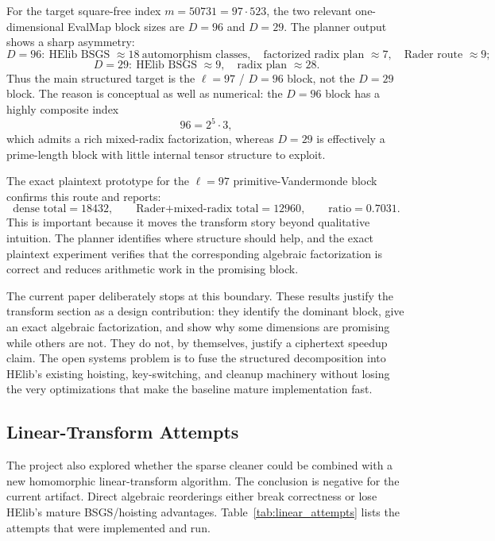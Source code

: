 \documentclass[a4paper,runningheads]{llncs}
\newcommand{\HElib}{\textsf{HElib}}
\begin{document}
For the target square-free index $m=50731=97\cdot523$, the two relevant
one-dimensional EvalMap block sizes are $D=96$ and $D=29$. The planner output
shows a sharp asymmetry:
\[
D=96:\ \text{HElib BSGS }\approx18\ \text{automorphism classes},\quad
\text{factorized radix plan }\approx7,\quad
\text{Rader route }\approx9;
\]
\[
D=29:\ \text{HElib BSGS }\approx9,\quad \text{radix plan }\approx28.
\]
Thus the main structured target is the $\ell=97$ / $D=96$ block, not the
$D=29$ block. The reason is conceptual as well as numerical: the $D=96$ block
has a highly composite index
\[
  96 = 2^5\cdot 3,
\]
which admits a rich mixed-radix factorization, whereas $D=29$ is effectively a
prime-length block with little internal tensor structure to exploit.

The exact plaintext prototype for the $\ell=97$ primitive-Vandermonde block
confirms this route and reports:
\[
  \text{dense total}=18432,
  \qquad
  \text{Rader+mixed-radix total}=12960,
  \qquad
  \text{ratio}=0.7031.
\]
This is important because it moves the transform story beyond qualitative
intuition. The planner identifies where structure should help, and the exact
plaintext experiment verifies that the corresponding algebraic factorization is
correct and reduces arithmetic work in the promising block.

The current paper deliberately stops at this boundary. These results justify the
transform section as a design contribution: they identify the dominant block,
give an exact algebraic factorization, and show why some dimensions are
promising while others are not. They do not, by themselves, justify a ciphertext
speedup claim. The open systems problem is to fuse the structured decomposition
into HElib's existing hoisting, key-switching, and cleanup machinery without
losing the very optimizations that make the baseline mature implementation fast.

\subsection{Linear-Transform Attempts}
\label{sec:linear-negative}

The project also explored whether the sparse cleaner could be combined with a
new homomorphic linear-transform algorithm. The conclusion is negative for the
current artifact. Direct algebraic reorderings either break correctness or lose
\HElib's mature BSGS/hoisting advantages. Table~\ref{tab:linear_attempts}
lists the attempts that were implemented and run.
\end{document}
